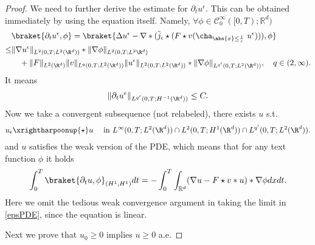 \begin{proof}
We need to further derive the estimate for $\partial_t u^\epsilon$. This can be obtained immediately by using the equation itself. Namely, $\forall  \phi  \in  \mathcal{C}_0^{\infty}([0,T);\mathbb{R}^{d} ) $
\begin{align*}
&\braket{\partial_t u^{\epsilon},\phi  } = \braket{\Delta  u ^{\epsilon} - \nabla * (\tilde j_{\epsilon}\star (F \star  v (\cha_{\abs{x}\le \frac{1}{\epsilon}} \ u^{\epsilon})) ), \phi  }\\
\le &\|\nabla u ^{\epsilon} \|_{L^{2}(0,T;L^{2}(\R^d) ) } * \|\nabla \phi \|_{L^{2}(0,T;L^{2}\R^d ) }\\ &\quad +\|F\|_{L^2(\R^d)} \|v\|_{L^q(0,T;L^2(\R^d))}\|u^{\epsilon} \|_{L^{2}(0,T;L^{2}(\R^d) ) } * \|\nabla \phi \|_{L^{q'}(0,T;L^{2}(\R^d) ) }, \quad q\in (2,\infty)
.\end{align*}
It means 
\begin{align*}
\|\partial_t u^{\epsilon} \|_{L^{q'}(0,T;H^{-1}(\R^d))}\le C
.\end{align*}
Now we take a convergent subsequence (not relabeled), there exists $u$ s.t. 
\begin{align*}
u_{\epsilon} \xrightharpoonup{\star } u  \quad \text{ in } L^{\infty}(0,T;L^{2}(\R^d) ) \cap L^{2}(0,T;H^{1}(\R^d) )\cap  L^{q'}(0,T;L^{2}(\R^d) ) 
.\end{align*}
and $u$ satisfies the weak version of the PDE, which means that for any text function $\phi$ it holds
\begin{align*}
\int_0^{T}    \braket{\partial_t u , \phi }_{(H^{1},H^{1}  )} dt = -\int_0^{T} \int_{\mathbb{R}^{d} }   (\nabla u -F \star v * u) *\nabla \phi  dx dt
.\end{align*}
Here we omit the tedious weak convergence argument in taking the limit in \autoref{epsPDE}, since the equation is linear.

\vskip5mm
Next we prove that $u_{0} \ge  0$ implies  $u \ge 0$ a.e.  


\end{proof}
